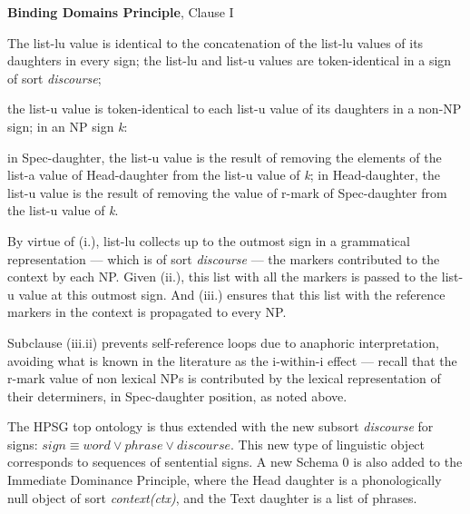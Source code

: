 \documentclass[output=paper
	        ,collection
	        ,collectionchapter
 	        ,biblatex
                ,babelshorthands
                ,newtxmath
                ,draftmode
                ,colorlinks, citecolor=brown
]{langscibook}
\begin{document}
\begin{exe}
\ex\label{bdp}
\textbf{Binding Domains Principle}, Clause I
\begin{xlisti}
\ex The {\sc list-lu} value is identical to the 
concatenation of the {\sc list-lu} values of its daughters in every sign;
\ex  the {\sc list-lu} and {\sc list-u} values are 
token-identical in a sign of sort {\it discourse};
\ex
\begin{xlisti}
\ex  the {\sc list-u} value is token-identical to each 
{\sc list-u} value of its daughters in a non-NP sign;
\ex in an NP sign {\it k}:

\begin{itemize}
\ex in Spec-daughter, the {\sc list-u} value is the result of removing the 
elements of the {\sc list-a} value of Head-daughter from the {\sc list-u} value of {\it k};
\ex in Head-daughter, the {\sc list-u} value is the result of removing 
the value of {\sc r-mark} of Spec-daughter from the {\sc list-u} value of {\it k}.
\end{itemize}

\end{xlisti}
\end{xlisti}
\end{exe}


\noindent By virtue of (i.), {\sc list-lu} collects up to the outmost sign in a grammatical 
representation --- which is of sort {\it discourse} --- the markers contributed to the context
by each NP. Given (ii.), this list with all the markers is passed to the
{\sc list-u} value at this outmost sign. And (iii.) ensures that this
list with the reference markers in the context is propagated to every NP. 

Subclause (iii.ii) prevents self-reference loops
due to anaphoric interpretation, avoiding what is known 
in the literature as the i-within-i effect --- recall that the {\sc r-mark} value of non lexical NPs 
is contributed by the 
lexical representation of their determiners, in Spec-daughter 
position, as noted above.

The HPSG top ontology is thus extended with the new subsort {\it discourse} 
for signs: $sign \equiv word \vee phrase \vee discourse$. This new type of 
linguistic object corresponds to sequences of sentential signs.
A new Schema 0 is also added to the
Immediate Dominance Principle, where the Head daughter is a 
phonologically null object of sort {\em context(ctx)}, and the Text daughter 
is a list of phrases. 
\end{document}
